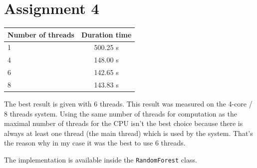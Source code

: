 \documentclass[12pt]{article}
\begin{document}
\newpage 

\section{Assignment 4}

\begin{center}
\begin{tabular}{|l|c|}
    \hline
    Number of threads & Duration time \\ \hline
    1 & 500.25 s \\ \hline
    4 & 148.00 s \\ \hline
    6 & 142.65 s \\ \hline
    8 & 143.83 s \\ \hline
\end{tabular}
\end{center}

The best result is given with 6 threads. This result was measured on the 4-core / 8 threads system. Using the same number of threads for computation as the maximal number of threads for the CPU isn't the best choice because there is always at least one thread (the main thread) which is used by the system. That's the reason why in my case it was the best to use 6 threads.

The implementation is available inside the \verb|RandomForest| class.

\end{document}
